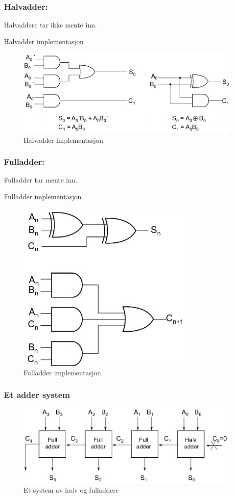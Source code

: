 \documentclass{article}
\begin{document}
	\subsubsection*{Halvadder:}
	Halvaddere tar ikke mente inn.
	
	Halvadder implementasjon
	\begin{figure}[H]
		\includegraphics[scale = 0.7]{halvadd.jpg}
		\caption{Halvadder implementasjon}
	\end{figure}
	
	\subsubsection*{Fulladder:}
	Fulladder tar mente inn.
	
	Fulladder implementasjon
	\begin{figure}[H]
		\includegraphics[scale = 0.7]{Fulladd.jpg}
		\caption{Fulladder implementasjon}
	\end{figure}
	
	\subsubsection*{Et adder system}
	\begin{figure}[H]
		\includegraphics[scale = 0.6]{adderment.jpg}
		\caption{Et system av halv og fulladdere}
	\end{figure}
	
\end{document}
